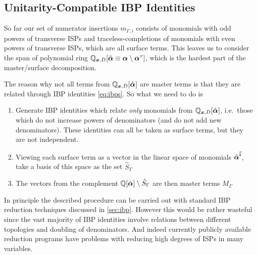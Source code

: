 


\subsection{Unitarity-Compatible IBP Identities}
\label{sec:unitarity_compatible_ibps}
So far our set of numerator insertions $m_{\Gamma,i}$ consists of monomials with odd powers of transverse ISPs and traceless-completions of
monomials with even powers of transverse ISPs, which are all surface terms.
This leaves us to consider the span of polynomial ring $\mathbb{Q}_{\vb*{x},D}[\hat{\vb*{\alpha}}\equiv \vb*{\alpha}\setminus\vb*{\alpha}^\tau]$,
which is the hardest part of the master/surface decomposition.

The reason why not all terms from $\mathbb{Q}_{\vb*{x},D}[\hat{\vb*{\alpha}}]$ are master terms is that they are
related through IBP identities \eqref{eq:ibps}. So what we need to do is
\begin{enumerate}
  \item Generate IBP identities which relate
    \emph{only} monomials from $\mathbb{Q}_{\vb*{x},D}[\hat{\vb*{\alpha}}]$, i.e.\ those which do not increase powers of denominators (and do not add new denominators).
    These identities can all be taken as surface terms, but they are not independent. 
    \label{item1}
  \item  Viewing each surface term as a vector in the linear space of monomials $\hat{\vb*{\alpha}}^{\va{i}}$, take
    a basis of this space as the set $\hat{S}_\Gamma$
    \label{item2}
  \item The vectors from the complement $\mathbb{Q}[\hat{\vb*{\alpha}}]\setminus \hat{S}_\Gamma$ are then master terms $M_\Gamma$
    \label{item3}
\end{enumerate}

In principle the described procedure can be carried out with standard IBP reduction techniques discussed in \cref{sec:ibp}.
However this would be rather wasteful
since the vast majority of IBP identities involve relations between different topologies and doubling of denominators.
And indeed currently publicly available reduction programs
\cite{Studerus:2009ye,vonManteuffel:2012np, Smirnov:2008iw,Smirnov:2014hma, Lee:2012cn,Lee:2013mka, Maierhoefer:2017hyi,Maierhofer:2018gpa}
have problems with reducing high degrees of ISPs in many variables.

